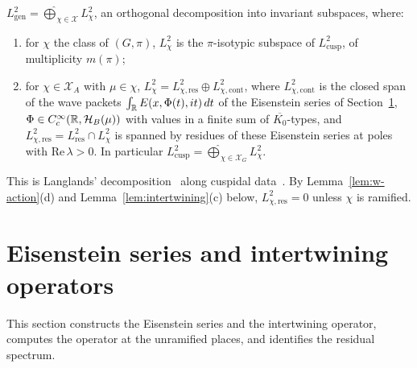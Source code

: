 \begin{proposition}\label{prop:Lchi}
$L^2_{\mathrm{gen}}=\widehat\bigoplus_{\chi\in\mathcal X}L^2_\chi$, an
orthogonal decomposition into invariant subspaces, where:
\begin{enumerate}[label=(\alph*)]
\item for $\chi$ the class of $(G,\pi)$, $L^2_\chi$ is the
  $\pi$-isotypic subspace of $L^2_{\mathrm{cusp}}$, of multiplicity
  $m(\pi)$;
\item for $\chi\in\mathcal X_A$ with $\mu\in\chi$,
  $L^2_\chi=L^2_{\chi,\mathrm{res}}\oplus L^2_{\chi,\mathrm{cont}}$, where
  $L^2_{\chi,\mathrm{cont}}$ is the closed span of the wave packets
  $\int_{\mathbb{R}} E(x,\Phi(t),it)\,dt$ of the Eisenstein series of
  Section~\ref{sec:eisenstein}, $\Phi\in C_c^\infty(\mathbb{R},\mathcal H_B(\mu))$
  with values in a finite sum of $\overline{K_0}$-types, and
  $L^2_{\chi,\mathrm{res}}=L^2_{\mathrm{res}}\cap L^2_\chi$ is spanned by
  residues of these Eisenstein series at poles with $\mathrm{Re}\,\lambda
  >0$. In particular $L^2_{\mathrm{cusp}}=\widehat\bigoplus_{\chi\in
  \mathcal X_G}L^2_\chi$.
\end{enumerate}
\end{proposition}

This is Langlands' decomposition~\cite[Ch.~7]{La76} along cuspidal
data~\cite[Ch.~II, V]{MW95}. By Lemma~\ref{lem:w-action}(d) and
Lemma~\ref{lem:intertwining}(c) below, $L^2_{\chi,\mathrm{res}}=0$ unless
$\chi$ is ramified.

\section{Eisenstein series and intertwining operators}\label{sec:eisenstein}

This section constructs the Eisenstein series and the intertwining
operator, computes the operator at the unramified places, and identifies
the residual spectrum.


